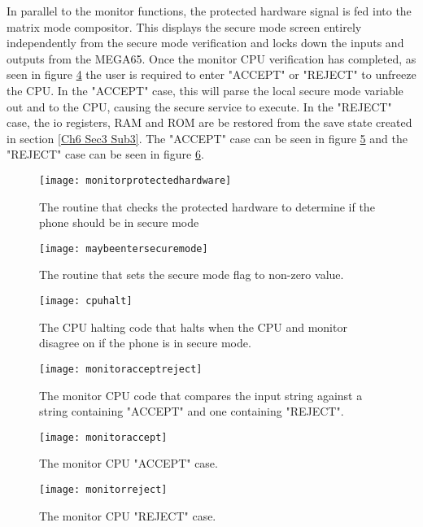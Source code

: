 In parallel to the monitor functions, the protected hardware signal is fed into the matrix mode compositor. This displays the secure mode screen entirely independently from the secure mode verification and locks down the inputs and outputs from the MEGA65. Once the monitor CPU verification has completed, as seen in figure \ref{fig:monitoracceptreject} the user is required to enter "ACCEPT" or "REJECT" to unfreeze the CPU. In the "ACCEPT" case, this will parse the local secure mode variable out and to the CPU, causing the secure service to execute. In the "REJECT" case, the io registers, RAM and ROM are be restored from the save state created in section \ref{Ch6 Sec3 Sub3}. The "ACCEPT" case can be seen in figure \ref{fig:monitoraccept} and the "REJECT" case can be seen in figure \ref{fig:monitorreject}.

\begin{figure}
  \centering
  \texttt{[image: monitorprotectedhardware]}
  \caption{The routine that checks the protected hardware to determine if the phone should be in secure mode}
  \label{fig:monitorprotectedhardware}
\end{figure}

\begin{figure}
  \centering
  \texttt{[image: maybeentersecuremode]}
  \caption{The routine that sets the secure mode flag to non-zero value.}
  \label{fig:maybeentersecuremode}
\end{figure}

\begin{figure}
  \centering
  \texttt{[image: cpuhalt]}
  \caption{The CPU halting code that halts when the CPU and monitor disagree on if the phone is in secure mode.}
  \label{fig:cpuhalt}
\end{figure}

\begin{figure}
  \centering
  \texttt{[image: monitoracceptreject]}
  \caption{The monitor CPU code that compares the input string against a string containing "ACCEPT" and one containing "REJECT".}
  \label{fig:monitoracceptreject}
\end{figure}

\begin{figure}
  \centering
  \texttt{[image: monitoraccept]}
  \caption{The monitor CPU "ACCEPT" case.}
  \label{fig:monitoraccept}
\end{figure}

\begin{figure}
  \centering
  \texttt{[image: monitorreject]}
  \caption{The monitor CPU "REJECT" case.}
  \label{fig:monitorreject}
\end{figure}

